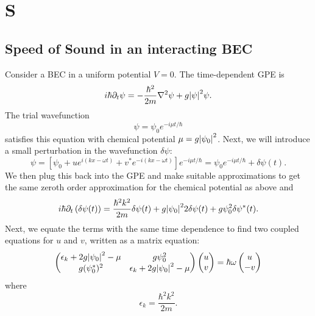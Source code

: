 \documentclass{book}
\theoremstyle{definition}
\newcommand{\p}{\partial}
\newcommand{\f}[2]{\frac{#1}{#2}}
\newcommand{\lp}{\left(}
\newcommand{\rp}{\right)}
\newcommand{\lb}{\left[}
\newcommand{\rb}{\right]}
\begin{document}
\chapter*{S}


\section*{Speed of Sound in an interacting BEC}

Consider a BEC in a uniform potential $V = 0$. The time-dependent GPE is 
\begin{equation*}
i\hbar \p_t \psi = -\f{\hbar^2}{2m} \nabla^2 \psi + g\abs{\psi}^2 \psi.
\end{equation*}
The trial wavefunction 
\begin{equation*}
\psi = \psi_0 e^{-i\mu t/\hbar}
\end{equation*}
satisfies this equation with chemical potential $\mu = g \abs{\psi_0}^2$. Next, we will introduce a small perturbation in the wavefunction $\delta \psi$:
\begin{equation*}
\psi = \lb \psi_0 + u e^{i(kx - \omega t )} + v^* e^{-i(kx - \omega t)} \rb e^{-i \mu t/\hbar} = \psi_0 e^{-i \mu t/\hbar} + \delta \psi(t).
\end{equation*}
We then plug this back into the GPE and make suitable approximations to get the same zeroth order approximation for the chemical potential as above and
\begin{equation*}
i\hbar \p_t \lp \delta \psi(t) \rp = \f{\hbar^2 k^2}{2m} \delta \psi(t) + g \abs{\psi_0}^2 2\delta \psi(t) + g \psi_0^2 \delta \psi^*(t).
\end{equation*}
Next, we equate the terms with the same time dependence to find two coupled equations for $u$ and $v$, written as a matrix equation:
\begin{equation*}
\begin{pmatrix}
\epsilon_k + 2g\abs{\psi_0}^2 - \mu & g\psi_0^2
\\ g (\psi_0^*)^2 & \epsilon_k + 2g \abs{\psi_0}^2 - \mu
\end{pmatrix}
\begin{pmatrix}
u\\v
\end{pmatrix}
= 
\hbar \omega \begin{pmatrix}
u \\-v
\end{pmatrix}
\end{equation*}
where 
\begin{equation*}
\epsilon_k = \f{\hbar^2 k^2}{2m}.
\end{equation*}
\end{document}
